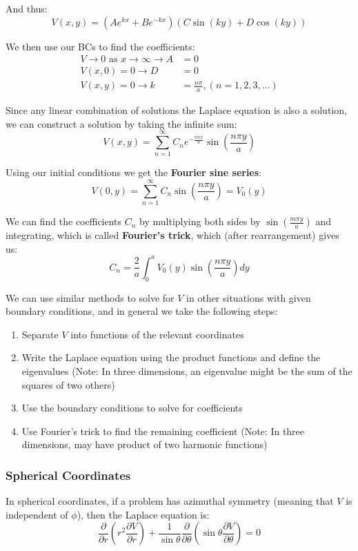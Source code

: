 \documentclass{article}
\begin{document}
\begin{answer}
    And thus:
    \[
        V(x,y)=(Ae^{kx}+Be^{-kx})(C\sin(ky)+D\cos(ky))
    \]

    We then use our BCs to find the coefficients:
    \begin{align*}
        V\to 0 \text{ as } x\to \infty \rightarrow A&=0 \\
        V(x,0)=0 \rightarrow D&=0 \\
        V(x,y)=0 \rightarrow k&=\frac{n \pi }{a}, (n=1,2,3,\dots)
    \end{align*}

    Since any linear combination of solutions the Laplace equation is also a solution, we can construct a solution 
    by taking the infinite sum:
    \[
        V(x,y)=\sum_{n=1}^{\infty }C_n e^{-\frac{n \pi x}{a}}\sin(\frac{n \pi y}{a})
    \]  

    Using our initial conditions we get the \textbf{Fourier sine series}:
    \[
        V(0,y)=\sum_{n=1}^{\infty }C_n\sin(\frac{n \pi y}{a})=V_0(y)
    \]

    We can find the coefficients \(C_n\) by multiplying both sides by \(\sin(\frac{m \pi y}{a})\) and integrating, which is called \textbf{Fourier's trick}, which (after rearrangement) gives us:
    \[
        C_n=\frac{2}{a}\int_0^a V_0(y)\sin(\frac{n \pi y}{a})dy
    \]
\end{answer}

We can use similar methods to solve for \(V\) in other situations with given boundary conditions, and in general we take the following steps:
\begin{enumerate}
    \item Separate \(V\) into functions of the relevant coordinates
    \item Write the Laplace equation using the product functions and define the eigenvalues (Note: In three dimensions, an eigenvalue might be the sum of the squares of two others)
    \item Use the boundary conditions to solve for coefficients
    \item Use Fourier's trick to find the remaining coefficient (Note: In three dimensions, may have product of two harmonic functions)
\end{enumerate}

\subsubsection{Spherical Coordinates}
In spherical coordinates, if a problem has azimuthal symmetry (meaning that \(V\) is independent of \(\phi\)), then the Laplace equation 
is:
\[
    \frac{\partial}{\partial r}(r^2 \frac{\partial V}{\partial r})+\frac{1}{\sin \theta }\frac{\partial}{\partial \theta }(\sin \theta \frac{\partial V}{\partial \theta })=0
\]
\end{document}
